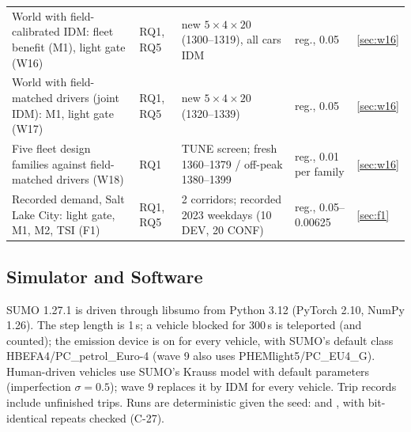 \begin{table}[t]
\begin{tabular}{@{}p{5.3cm}p{1.5cm}p{6.0cm}p{2.5cm}l@{}}
World with field-calibrated IDM: fleet benefit (M1), light gate (W16) & RQ1, RQ5 & new $5\times4\times20$ (1300--1319), all cars IDM & reg., 0.05 & \ref{sec:w16}\\
World with field-matched drivers (joint IDM): M1, light gate (W17) & RQ1, RQ5 & new $5\times4\times20$ (1320--1339) & reg., 0.05 & \ref{sec:w16}\\
Five fleet design families against field-matched drivers (W18) & RQ1 & TUNE screen; fresh 1360--1379 / off-peak 1380--1399 & reg., 0.01 per family & \ref{sec:w16}\\
Recorded demand, Salt Lake City: light gate, M1, M2, TSI (F1) & RQ1, RQ5 & 2 corridors; recorded 2023 weekdays (10 DEV, 20 CONF) & reg., 0.05--0.00625 & \ref{sec:f1}\\\bottomrule
\end{tabular}\end{table}

\subsection{Simulator and Software}
SUMO 1.27.1 \cite{lopez2018} is driven through libsumo from Python 3.12 (PyTorch 2.10, NumPy 1.26). The step length is 1\,s; a vehicle
blocked for 300\,s is teleported (and counted); the emission device is on for every vehicle, with SUMO's default class
HBEFA4/PC\_petrol\_Euro-4 \cite{krajzewicz2015} (wave 9 also uses PHEMlight5/PC\_EU4\_G). Human-driven vehicles use SUMO's Krauss model
\cite{krauss1998} with default parameters (imperfection $\sigma=0.5$); wave 9 replaces it by IDM \cite{treiber2000} for every vehicle.
Trip records include unfinished trips. Runs are deterministic given the seed:  and , with
bit-identical repeats checked (C-27).

